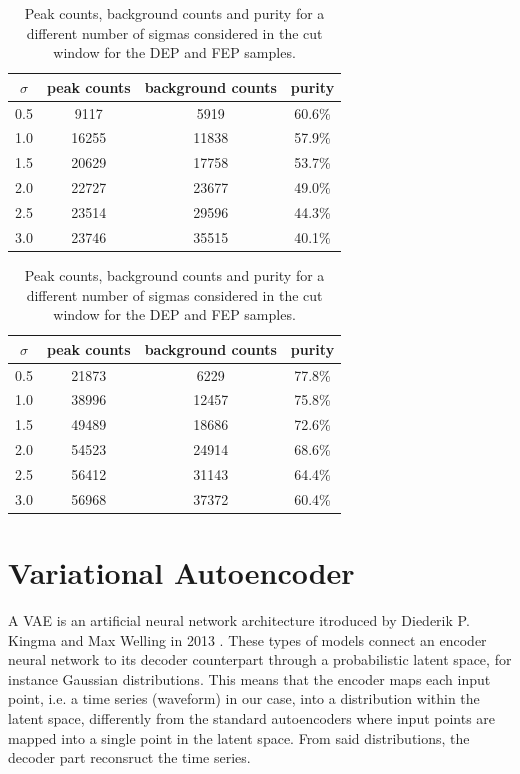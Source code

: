 \begin{table}[H]
\centering
\begin{minipage}{0.48\textwidth}
\centering
\begin{tabular}{cccc}
\toprule
$\sigma$ & peak counts & background counts & purity \\
\midrule
0.5 & 9117  & 5919  & 60.6\% \\
1.0 & 16255 & 11838 & 57.9\% \\
1.5 & 20629 & 17758 & 53.7\% \\
2.0 & 22727 & 23677 & 49.0\% \\
2.5 & 23514 & 29596 & 44.3\% \\
3.0 & 23746 & 35515 & 40.1\% \\
\bottomrule
\end{tabular}
\caption{\ac{DEP} sample}
\label{tab:purity_sse}
\end{minipage}
\hfill
\begin{minipage}{0.48\textwidth}
\centering
\begin{tabular}{cccc}
\toprule
$\sigma$ & peak counts & background counts & purity \\
\midrule
0.5 & 21873 & 6229  & 77.8\% \\
1.0 & 38996 & 12457 & 75.8\% \\
1.5 & 49489 & 18686 & 72.6\% \\
2.0 & 54523 & 24914 & 68.6\% \\
2.5 & 56412 & 31143 & 64.4\% \\
3.0 & 56968 & 37372 & 60.4\% \\
\bottomrule
\end{tabular}
\caption{\ac{FEP} sample}
\label{tab:purity_mse}
\end{minipage}
\caption{Peak counts, background counts and purity for a different number of sigmas considered in the cut window for the \ac{DEP} and \ac{FEP} samples.}
\label{tab:purity}
\end{table}



\newpage
\section{Variational Autoencoder}
\label{sec:VAE}
A \ac{VAE} is an artificial neural network architecture itroduced by Diederik P. Kingma and Max Welling in 2013 \cite{originalVAEarticle}. These types of models connect an encoder neural network to its decoder counterpart through a probabilistic latent space, for instance Gaussian distributions. This means that the encoder maps each input point, i.e. a time series (waveform) in our case, into a distribution within the latent space, differently from the standard autoencoders where input points are mapped into a single point in the latent space. From said distributions, the decoder part reconsruct the time series. 
